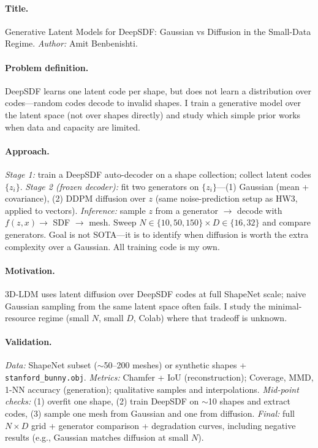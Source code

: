 \paragraph{Title.} Generative Latent Models for DeepSDF: Gaussian vs Diffusion
in the Small-Data Regime. \emph{Author:} Amit Benbenishti.

\paragraph{Problem definition.} DeepSDF learns one latent code per shape, but
does not learn a distribution over codes---random codes decode to invalid
shapes. I train a generative model over the latent space (not over shapes
directly) and study which simple prior works when data and capacity are limited.

\paragraph{Approach.} \emph{Stage 1:} train a DeepSDF auto-decoder on a shape
collection; collect latent codes $\{z_i\}$. \emph{Stage 2 (frozen decoder):} fit
two generators on $\{z_i\}$---(1) Gaussian (mean + covariance), (2) DDPM
diffusion over $z$ (same noise-prediction setup as HW3, applied to vectors).
\emph{Inference:} sample $z$ from a generator $\rightarrow$ decode with
$f(z, x) \rightarrow$ SDF $\rightarrow$ mesh. Sweep $N \in \{10, 50, 150\} \times
D \in \{16, 32\}$ and compare generators. Goal is not SOTA---it is to identify
when diffusion is worth the extra complexity over a Gaussian. All training code
is my own.

\paragraph{Motivation.} 3D-LDM uses latent diffusion over DeepSDF codes at full
ShapeNet scale; naive Gaussian sampling from the same latent space often fails.
I study the minimal-resource regime (small $N$, small $D$, Colab) where that
tradeoff is unknown.

\paragraph{Validation.} \emph{Data:} ShapeNet subset ($\sim$50--200 meshes) or
synthetic shapes + \texttt{stanford\_bunny.obj}. \emph{Metrics:} Chamfer + IoU
(reconstruction); Coverage, MMD, 1-NN accuracy (generation); qualitative samples
and interpolations. \emph{Mid-point checks:} (1) overfit one shape, (2) train
DeepSDF on $\sim$10 shapes and extract codes, (3) sample one mesh from Gaussian
and one from diffusion. \emph{Final:} full $N\times D$ grid + generator
comparison + degradation curves, including negative results (e.g., Gaussian
matches diffusion at small $N$).

